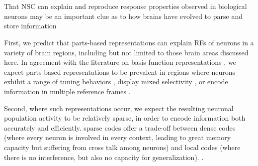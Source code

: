 \section*{}
\label{sec:discussion}

That \ac{NSC} can explain and reproduce response properties observed in biological neurons may be an important clue as to how brains have evolved to parse and store information

First, we predict that parts-based representations can explain
\acp{RF} of neurons in a variety of brain regions,
including but not limited to those brain areas discussed here. 
In agreement with the literature on basis function representations
\cite{PougetSejnowski1997,PougetSnyder2000,Poggio1990},
we expect parts-based representations
to be prevalent in regions where neurons
exhibit a range of tuning behaviors \cite{Beyeler2016},
display mixed selectivity \cite{Fusi2016,Eichenbaum2017},
or encode information in multiple reference frames \cite{AlexanderNitz2015,Rounds2016,Rounds2018}.

Second, where such representations occur, we expect the resulting
neuronal population activity to be relatively sparse,
in order to encode information both accurately and efficiently.
sparse codes offer a trade-off between 
dense codes (where every neuron is involved in every context,
leading to great memory capacity but suffering from cross talk among neurons)
and local codes (where there is no interference, 
but also no capacity for generalization). %
.





